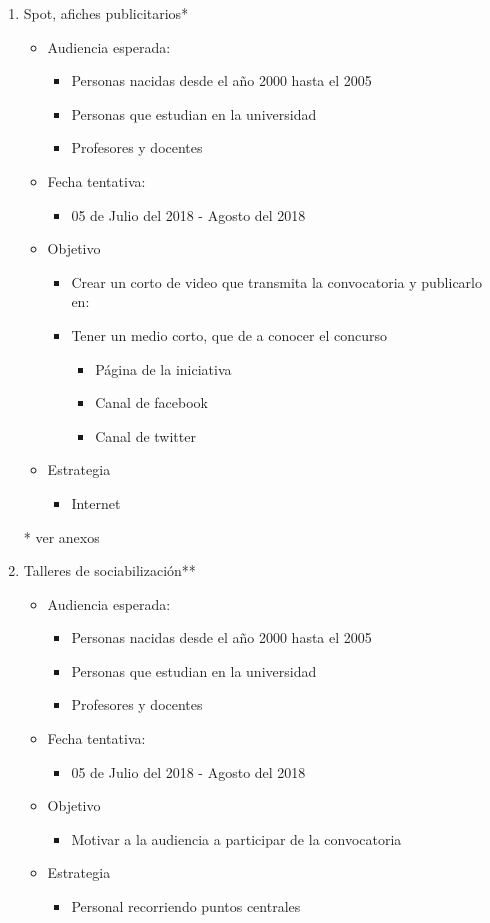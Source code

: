 \documentclass{article}
\begin{document}
\begin{enumerate}
\item Spot, afiches publicitarios* 
\begin{itemize}
\item Audiencia esperada:
\begin{itemize}
\item Personas nacidas desde el año 2000 hasta el 2005
\item Personas que estudian en la universidad
\item Profesores y docentes
\end{itemize}
\item Fecha tentativa:
\begin{itemize}
\item 05 de Julio del 2018 - Agosto del 2018
\end{itemize}
\item Objetivo
\begin{itemize}
\item Crear un corto de video que transmita la convocatoria y publicarlo en:
\item Tener un medio corto, que de a conocer el concurso
\begin{itemize}
\item Página de la iniciativa 
\item Canal de facebook
\item Canal de twitter
\end{itemize}
\end{itemize}
\item Estrategia
\begin{itemize}
\item Internet
\end{itemize}
\end{itemize}
* ver anexos

\item Talleres de sociabilización** 
\begin{itemize}
\item Audiencia esperada:
\begin{itemize}
\item Personas nacidas desde el año 2000 hasta el 2005
\item Personas que estudian en la universidad
\item Profesores y docentes
\end{itemize}
\item Fecha tentativa:
\begin{itemize}
\item 05 de Julio del 2018 - Agosto del 2018
\end{itemize}
\item Objetivo
\begin{itemize}
\item Motivar a la audiencia a participar de la convocatoria
\end{itemize}
\item Estrategia
\begin{itemize}
\item Personal recorriendo puntos centrales
\end{itemize}
\end{itemize}


\end{enumerate}
\end{document}

